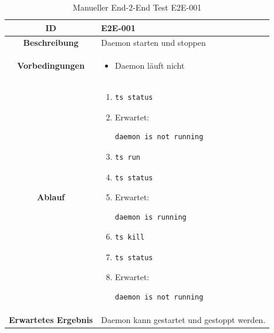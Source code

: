 \documentclass[a4paper,12pt]{report}
\begin{document}
    \begin{table}[h!]
        \centering
        \setlength{\leftmargini}{0.8cm}
        \begin{tabular}{|c|p{10cm}|}
            \hline
            \textbf{ID}                  & E2E-001                                    \\ \hline
            \textbf{Beschreibung}        & Daemon starten und stoppen                 \\ \hline
            \textbf{Vorbedingungen} &
            \begin{itemize}
                \item Daemon läuft nicht
            \end{itemize} \\ \hline
            \textbf{Ablauf} &
            \begin{enumerate}
                \item \begin{verbatim}ts status
                \end{verbatim}
                \item Erwartet: \begin{verbatim}daemon is not running
                \end{verbatim}
                \item \begin{verbatim}ts run
                \end{verbatim}
                \item \begin{verbatim}ts status
                \end{verbatim}
                \item Erwartet: \begin{verbatim}daemon is running
                \end{verbatim}
                \item \begin{verbatim}ts kill
                \end{verbatim}
                \item \begin{verbatim}ts status
                \end{verbatim}
                \item Erwartet: \begin{verbatim}daemon is not running
                \end{verbatim}
            \end{enumerate} \\ \hline
            \textbf{Erwartetes Ergebnis} & Daemon kann gestartet und gestoppt werden. \\ \hline
        \end{tabular}
        \caption{Manueller End-2-End Test E2E-001}\label{tab:e2e-1}
    \end{table}
\end{document}
